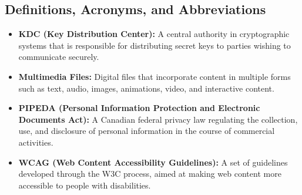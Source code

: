 \documentclass[]{article}
\begin{document}
\subsection{Definitions, Acronyms, and Abbreviations}
\label{sub:definitions_acronyms_and_abbreviations}
\begin{itemize}
    \item \textbf{KDC (Key Distribution Center):} A central authority in cryptographic systems that is responsible for distributing secret keys to parties wishing to communicate securely.
    \item \textbf{Multimedia Files:} Digital files that incorporate content in multiple forms such as text, audio, images, animations, video, and interactive content.
    \item \textbf{PIPEDA (Personal Information Protection and Electronic Documents Act):} A Canadian federal privacy law regulating the collection, use, and disclosure of personal information in the course of commercial activities.
    \item \textbf{WCAG (Web Content Accessibility Guidelines):} A set of guidelines developed through the W3C process, aimed at making web content more accessible to people with disabilities.
\end{itemize}
\end{document}
